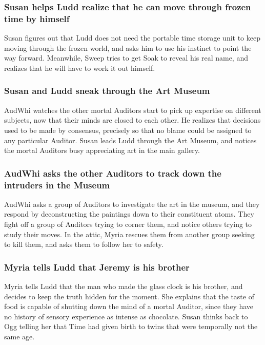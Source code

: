\subsubsection{\Gls{Susan} helps \Gls{Ludd} realize that he can move through frozen time by himself}
\Gls{Susan} figures out that \Gls{Ludd} does not need the portable time storage unit to keep moving
through the frozen world, and asks him to use his instinct to point the way forward. Meanwhile,
\Gls{Sweep} tries to get \Gls{Soak} to reveal his real name, and realizes that he will have to work
it out himself.

\subsubsection{\Gls{Susan} and \Gls{Ludd} sneak through the Art Museum}
\Gls{AudWhi} watches the other mortal Auditors start to pick up expertise on different subjects,
now that their minds are closed to each other. He realizes that decisions used to be made by
consensus, precisely so that no blame could be assigned to any particular Auditor. \Gls{Susan} leads
\Gls{Ludd} through the Art Museum, and notices the mortal Auditors busy appreciating art in the
main gallery.

\subsubsection{\Gls{AudWhi} asks the other Auditors to track down the intruders in the Museum}
\Gls{AudWhi} asks a group of Auditors to investigate the art in the museum, and they respond by
deconstructing the paintings down to their constituent atoms. They fight off a group of Auditors
trying to corner them, and notice others trying to study their moves. In the attic, \Gls{Myria}
rescues them from another group seeking to kill them, and asks them to follow her to safety.

\subsubsection{\Gls{Myria} tells \Gls{Ludd} that \Gls{Jeremy} is his brother}
\Gls{Myria} tells \Gls{Ludd} that the man who made the glass clock is his brother, and decides to
keep the truth hidden for the moment. She explains that the taste of food is capable of shutting
down the mind of a mortal Auditor, since they have no history of sensory experience as intense as
chocolate. \Gls{Susan} thinks back to \Gls{Ogg} telling her that \Gls{Time} had given birth to
twins that were temporally not the same age.

